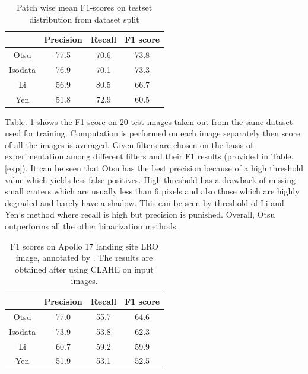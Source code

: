 \documentclass[11pt]{article}
\begin{document}
\begin{table}[H]
	\centering
	\caption{Patch wise mean F1-scores on testset distribution from dataset split}
	\begin{tabular}{c|c|c|c|}
		\cline{2-4}
		\multicolumn{1}{l|}{}         & Precision & Recall & F1 score \\ \hline
		\multicolumn{1}{|c|}{Otsu}    & 77.5      & 70.6   & 73.8     \\ \hline
		\multicolumn{1}{|c|}{Isodata} & 76.9      & 70.1   & 73.3     \\ \hline
		\multicolumn{1}{|c|}{Li}      & 56.9      & 80.5   & 66.7     \\ \hline
		\multicolumn{1}{|c|}{Yen}     & 51.8      & 72.9   & 60.5     \\ \hline
	\end{tabular}
\label{mine}
\end{table}

Table. \ref{mine} shows the F1-score on 20 test images taken out from the same dataset used for training. Computation is performed on each image separately then score of all the images is averaged. Given filters are chosen on the basis of experimentation among different filters and their F1 results (provided in Table. \ref{exp}). It can be seen that Otsu has the best precision because of a high threshold value which yields less false positives. High threshold has a drawback of missing small craters which are usually less than 6 pixels and also those which are highly degraded and barely have a shadow. This can be seen by threshold of Li and Yen's method where recall is high but precision is punished. Overall, Otsu outperforms all the other binarization methods.

\begin{table}[H]
	\centering
	\caption{F1 scores on Apollo 17 landing site LRO image, annotated by \cite{dino2020}. The results are obtained after using CLAHE on input images.}
	\begin{tabular}{c|c|c|c|}
		\cline{2-4}
		\multicolumn{1}{l|}{}         & Precision & Recall & F1 score \\ \hline
		\multicolumn{1}{|c|}{Otsu}    & 77.0      & 55.7   & 64.6     \\ \hline
		\multicolumn{1}{|c|}{Isodata} & 73.9      & 53.8   & 62.3     \\ \hline
		\multicolumn{1}{|c|}{Li}      & 60.7      & 59.2   & 59.9     \\ \hline
		\multicolumn{1}{|c|}{Yen}     & 51.9      & 53.1   & 52.5     \\ \hline
	\end{tabular}
\label{dino}
\end{table}
\end{document}
